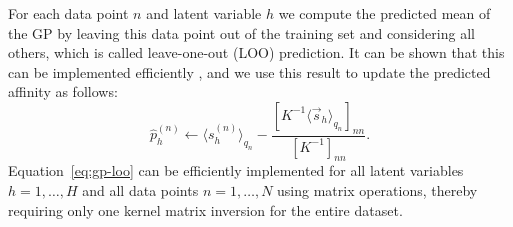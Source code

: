 For each data point $n$ and latent variable $h$ we compute the predicted mean of the GP by leaving 
this data point out of the training set and considering all others, which is called leave-one-out (LOO) prediction.
It can be shown that this can be implemented efficiently \citep[see Section 5.4.2 in ][]{RasmussenGPbook}, 
and we use this result to update the predicted affinity as follows:
%
%
\vspace{-.2cm}  %
\begin{equation}\label{eq:gp-loo}
\hat{p}_{h}^{(n)} \leftarrow   
\langle s_h^{(n)}\rangle_{q_n} - \frac{ [ K^{-1} \langle\vec{s}_{h}\rangle_{q_n} ]_{nn} }{ [ K^{-1} ]_{nn} }.
\end{equation}
%
%
Equation~\eqref{eq:gp-loo} can be efficiently implemented for all latent variables $h=1,\dots,H$ and all data points $n=1,\dots,N$ using matrix operations, thereby requiring only one kernel matrix inversion for the entire dataset.
%
%
%

